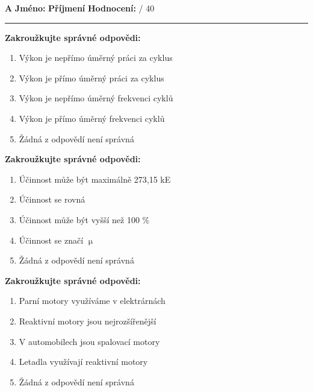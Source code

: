 \documentclass[../main.tex]{subfiles}
\begin{document}
\edef\hmm{\pdfpagewidth=\the\pdfpagewidth \pdfpageheight=\the\pdfpageheight\relax}
\pdfpagewidth=210mm
\pdfpageheight=297mm

\textbf{A}
\hspace{1cm}
\textbf{Jméno:}
\tecky{4cm}
\hspace{0.25cm}
\textbf{Příjmení}
\tecky{4cm}
\hfill
\textbf{Hodnocení:}
\tecky{0.5cm}
{/}
{40}
\vspace{0.25cm}
\hrule
\vspace{0.25cm}

\begin{enumerate}[label={\textbf{\arabic*.}}]
\begin{minipage}{0.45\textwidth}
    \item \textbf{Zakroužkujte správné odpovědi:}
        \begin{enumerate}[label={\alph*)}, itemsep=0pt, topsep=0.15cm]
            \item {Výkon je nepřímo úměrný práci za cyklus}
            \item {Výkon je přímo úměrný práci za cyklus}
            \item {Výkon je nepřímo úměrný frekvenci cyklů}
            \item {Výkon je přímo úměrný frekvenci cyklů}
            \item {Žádná z odpovědí není správná}
        \end{enumerate}

    \item \textbf{Zakroužkujte správné odpovědi:}
        \begin{enumerate}[label={\alph*)}, itemsep=0pt, topsep=0.15cm]
            \item {Účinnost může být maximálně 273,15 kE}
            \item {Účinnost se rovná }
            \item {Účinnost může být vyšší než 100 \%}
            \item {Účinnost se značí \(\upmu\)}
            \item {Žádná z odpovědí není správná}
        \end{enumerate}

    \item \textbf{Zakroužkujte správné odpovědi:}
        \begin{enumerate}[label={\alph*)}, itemsep=0pt, topsep=0.15cm]
            \item {Parní motory využíváme v elektrárnách}
            \item {Reaktivní motory jsou nejrozšířenější}
            \item {V automobilech jsou spalovací motory}
            \item {Letadla využívají reaktivní motory}
            \item {Žádná z odpovědí není správná}
        \end{enumerate}


\end{minipage}
\end{enumerate}
\end{document}
